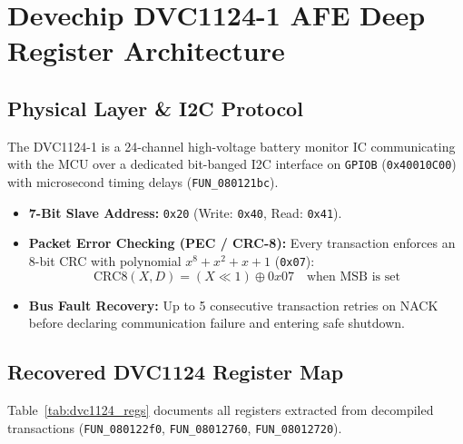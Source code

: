 \documentclass[10pt,a4paper]{article}
\begin{document}
\section{Devechip DVC1124-1 AFE Deep Register Architecture}

\subsection{Physical Layer \& I2C Protocol}
The DVC1124-1 is a 24-channel high-voltage battery monitor IC communicating with the MCU over a dedicated bit-banged I2C interface on \texttt{GPIOB} (\texttt{0x40010C00}) with microsecond timing delays (\texttt{FUN\_080121bc}).
\begin{itemize}
    \item \textbf{7-Bit Slave Address:} \texttt{0x20} (Write: \texttt{0x40}, Read: \texttt{0x41}).
    \item \textbf{Packet Error Checking (PEC / CRC-8):} Every transaction enforces an 8-bit CRC with polynomial $x^8 + x^2 + x + 1$ (\texttt{0x07}):
    \begin{equation}
        \text{CRC8}(X, D) = (X \ll 1) \oplus 0x07 \quad \text{when MSB is set}
    \end{equation}
    \item \textbf{Bus Fault Recovery:} Up to 5 consecutive transaction retries on NACK before declaring communication failure and entering safe shutdown.
\end{itemize}

\subsection{Recovered DVC1124 Register Map}
Table~\ref{tab:dvc1124_regs} documents all registers extracted from decompiled transactions (\texttt{FUN\_080122f0}, \texttt{FUN\_08012760}, \texttt{FUN\_08012720}).
\end{document}
